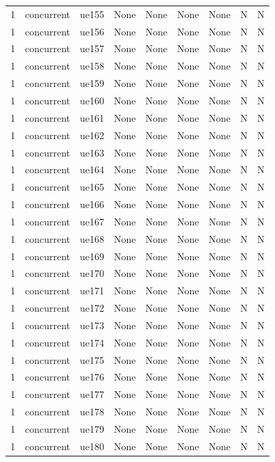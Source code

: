 \begin{table}[ht]
\begin{tabular}{|c|c|c|c|c|c|c|c|c|}
1 & concurrent & ue155 & None & None & None & None & N & N \\
1 & concurrent & ue156 & None & None & None & None & N & N \\
1 & concurrent & ue157 & None & None & None & None & N & N \\
1 & concurrent & ue158 & None & None & None & None & N & N \\
1 & concurrent & ue159 & None & None & None & None & N & N \\
1 & concurrent & ue160 & None & None & None & None & N & N \\
1 & concurrent & ue161 & None & None & None & None & N & N \\
1 & concurrent & ue162 & None & None & None & None & N & N \\
1 & concurrent & ue163 & None & None & None & None & N & N \\
1 & concurrent & ue164 & None & None & None & None & N & N \\
1 & concurrent & ue165 & None & None & None & None & N & N \\
1 & concurrent & ue166 & None & None & None & None & N & N \\
1 & concurrent & ue167 & None & None & None & None & N & N \\
1 & concurrent & ue168 & None & None & None & None & N & N \\
1 & concurrent & ue169 & None & None & None & None & N & N \\
1 & concurrent & ue170 & None & None & None & None & N & N \\
1 & concurrent & ue171 & None & None & None & None & N & N \\
1 & concurrent & ue172 & None & None & None & None & N & N \\
1 & concurrent & ue173 & None & None & None & None & N & N \\
1 & concurrent & ue174 & None & None & None & None & N & N \\
1 & concurrent & ue175 & None & None & None & None & N & N \\
1 & concurrent & ue176 & None & None & None & None & N & N \\
1 & concurrent & ue177 & None & None & None & None & N & N \\
1 & concurrent & ue178 & None & None & None & None & N & N \\
1 & concurrent & ue179 & None & None & None & None & N & N \\
1 & concurrent & ue180 & None & None & None & None & N & N \\

\end{tabular}
\end{table}
